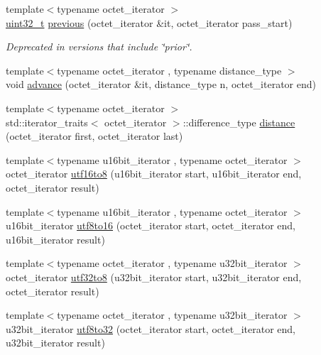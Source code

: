 \begin{DoxyCompactItemize}
\item 
{\footnotesize template$<$typename octet\+\_\+iterator $>$ }\\\hyperlink{namespaceutf8_a846259d2f173d524282583fc9d825b00}{uint32\+\_\+t} \hyperlink{namespaceutf8_aedaf9315740d4f25b43c188b02b5bcd0}{previous} (octet\+\_\+iterator \&it, octet\+\_\+iterator pass\+\_\+start)
\begin{DoxyCompactList}\small\item\em Deprecated in versions that include \char`\"{}prior\char`\"{}. \end{DoxyCompactList}\item 
{\footnotesize template$<$typename octet\+\_\+iterator , typename distance\+\_\+type $>$ }\\void \hyperlink{namespaceutf8_a411eec0d2919810bb26966be242c1e9e}{advance} (octet\+\_\+iterator \&it, distance\+\_\+type n, octet\+\_\+iterator end)
\item 
{\footnotesize template$<$typename octet\+\_\+iterator $>$ }\\std\+::iterator\+\_\+traits$<$ octet\+\_\+iterator $>$\+::difference\+\_\+type \hyperlink{namespaceutf8_a75394fbfe91b1122e2602a6d73c5f612}{distance} (octet\+\_\+iterator first, octet\+\_\+iterator last)
\item 
{\footnotesize template$<$typename u16bit\+\_\+iterator , typename octet\+\_\+iterator $>$ }\\octet\+\_\+iterator \hyperlink{namespaceutf8_acb68503442bd2e797e8fc8a960f54cf8}{utf16to8} (u16bit\+\_\+iterator start, u16bit\+\_\+iterator end, octet\+\_\+iterator result)
\item 
{\footnotesize template$<$typename u16bit\+\_\+iterator , typename octet\+\_\+iterator $>$ }\\u16bit\+\_\+iterator \hyperlink{namespaceutf8_a6404050074139c367a42f0a911779903}{utf8to16} (octet\+\_\+iterator start, octet\+\_\+iterator end, u16bit\+\_\+iterator result)
\item 
{\footnotesize template$<$typename octet\+\_\+iterator , typename u32bit\+\_\+iterator $>$ }\\octet\+\_\+iterator \hyperlink{namespaceutf8_a4a1157ef2f85d4bc8366dbbea20dcb48}{utf32to8} (u32bit\+\_\+iterator start, u32bit\+\_\+iterator end, octet\+\_\+iterator result)
\item 
{\footnotesize template$<$typename octet\+\_\+iterator , typename u32bit\+\_\+iterator $>$ }\\u32bit\+\_\+iterator \hyperlink{namespaceutf8_a8020ed399788dca779663adf061ed718}{utf8to32} (octet\+\_\+iterator start, octet\+\_\+iterator end, u32bit\+\_\+iterator result)

\end{DoxyCompactItemize}
